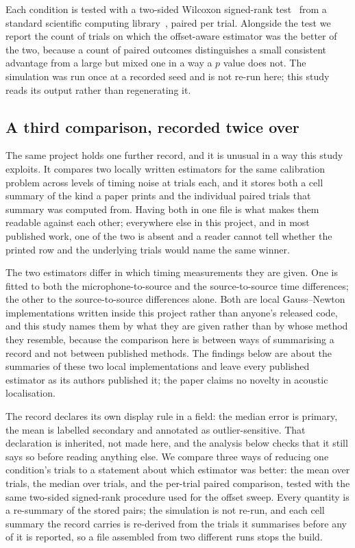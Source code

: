 Each condition is tested with a two-sided Wilcoxon signed-rank
test~\cite{wilcoxon1945individual} from a standard scientific computing
library~\cite{virtanen2020scipy}, paired per trial. Alongside the test we report
the count of trials on which the offset-aware estimator was the better of the
two, because a count of \NTrials{} paired outcomes distinguishes a small
consistent advantage from a large but mixed one in a way a $p$ value does not.
The simulation was run once at a recorded seed and is not re-run here; this study
reads its output rather than regenerating it.

\subsection{A third comparison, recorded twice over}

The same project holds one further record, and it is unusual in a way this study
exploits. It compares two locally written estimators for the same calibration
problem across \CxConditions{} levels of timing noise at
\CxTrialsPerCondition{} trials each, and it stores both a cell summary of the
kind a paper prints and the individual paired trials that summary was computed
from. Having both in one file is what makes them readable against each other;
everywhere else in this project, and in most published work, one of the two is
absent and a reader cannot tell whether the printed row and the underlying
trials would name the same winner.

The two estimators differ in which timing measurements they are given. One is
fitted to both the microphone-to-source and the source-to-source time
differences; the other to the source-to-source differences alone. Both are local
Gauss--Newton implementations written inside this project rather than anyone's
released code, and this study names them by what they are given rather than by
whose method they resemble, because the comparison here is between ways of
summarising a record and not between published methods. The findings below are
about the summaries of these two local implementations and leave every
published estimator as its authors published it; the paper claims no novelty in
acoustic localisation.

The record declares its own display rule in a field: the median error is
primary, the mean is labelled secondary and annotated as outlier-sensitive. That
declaration is inherited, not made here, and the analysis below checks that it
still says so before reading anything else. We compare three ways of reducing
one condition's trials to a statement about which estimator was better: the mean
over trials, the median over trials, and the per-trial paired comparison, tested
with the same two-sided signed-rank procedure used for the offset sweep. Every
quantity is a re-summary of the stored pairs; the simulation is not re-run, and
each cell summary the record carries is re-derived from the trials it summarises
before any of it is reported, so a file assembled from two different runs stops
the build.

